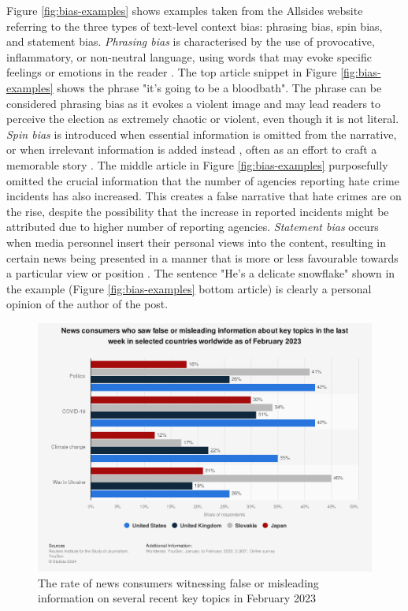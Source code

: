 Figure \ref{fig:bias-examples} shows examples taken from the Allsides website \cite{allsides-media-bias-types} referring to the three types of text-level context bias: phrasing bias, spin bias, and statement bias. \textit{Phrasing bias} is characterised by the use of provocative, inflammatory, or non-neutral language, using words that may evoke specific feelings or emotions in the reader \cite{spinde-2024-taxonomy,hube-2019-neural-biased-language}. The top article snippet in Figure \ref{fig:bias-examples} shows the phrase "it's going to be a bloodbath". The phrase can be considered phrasing bias as it evokes a violent image and may lead readers to perceive the election as extremely chaotic or violent, even though it is not literal. \textit{Spin bias} is introduced when essential information is omitted from the narrative, or when irrelevant information is added instead \cite{spinde-2024-taxonomy}, often as an effort to craft a memorable story \cite{mullainathan-2002-media-bias}. The middle article in Figure \ref{fig:bias-examples} purposefully omitted the crucial information that the number of agencies reporting hate crime incidents has also increased. This creates a false narrative that hate crimes are on the rise, despite the possibility that the increase in reported incidents might be attributed due to higher number of reporting agencies. \textit{Statement bias} occurs when media personnel insert their personal views into the content, resulting in certain news being presented in a manner that is more or less favourable towards a particular view or position \cite{spinde-2024-taxonomy,d-alessio-2000-meta-analysis}. The sentence "He's a delicate snowflake" shown in the example (Figure \ref{fig:bias-examples} bottom article) is clearly a personal opinion of the author of the post.

\begin{figure}[htbp]
    \centering
    \includegraphics[width=0.9\linewidth]{images/statistic_id1317019_consumers-witnessing-false-information-on-certain-topics-worldwide-2023.png}
    \caption{The rate of news consumers witnessing false or misleading information on several recent key topics in February 2023 \cite{reuters-2023-false-info}}
    \label{fig:consumers-witnessing-false-information-on-certain-topics-worldwide-2023}
\end{figure}


